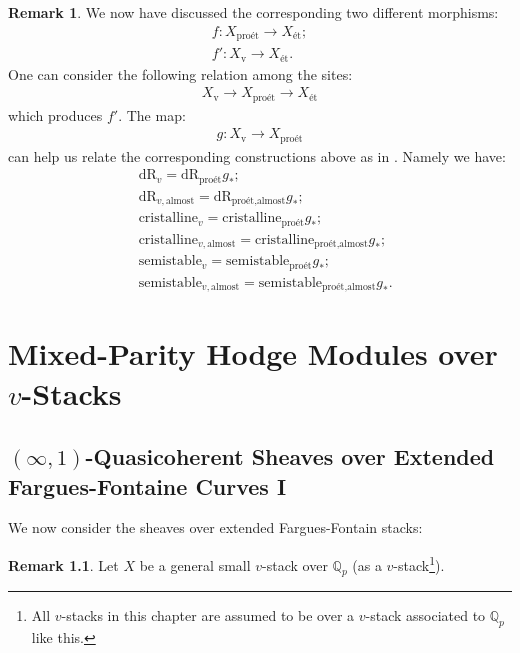 \documentclass[12pt]{book}
\theoremstyle{definition}
\newtheorem{remark}{Remark}
\begin{document}
\begin{remark}
We now have discussed the corresponding two different morphisms:
\begin{align}
f: X_\text{pro\'et}\longrightarrow X_\text{\'et};\\
f': X_\text{v}\longrightarrow X_\text{\'et}.
\end{align}
One can consider the following relation among the sites:
\begin{align}
X_\text{v}\longrightarrow X_\text{pro\'et}\longrightarrow X_\text{\'et}
\end{align}
which produces $f'$. The map:
\begin{align}
g: X_\text{v}\longrightarrow X_\text{pro\'et}
\end{align}
can help us relate the corresponding constructions above as in \cite[Proposition 2.37]{B}. Namely we have:
\begin{align}
&\mathrm{dR}_{v}=\mathrm{dR}_{\text{pro\'et}}g_*;\\
&\mathrm{dR}_{v,\text{almost}}=\mathrm{dR}_{\text{pro\'et},\text{almost}}g_*;\\
&\mathrm{cristalline}_{v}=\mathrm{cristalline}_{\text{pro\'et}}g_*;\\
&\mathrm{cristalline}_{v,\text{almost}}=\mathrm{cristalline}_{\text{pro\'et},\text{almost}}g_*;\\
&\mathrm{semistable}_{v}=\mathrm{semistable}_{\text{pro\'et}}g_*;\\
&\mathrm{semistable}_{v,\text{almost}}=\mathrm{semistable}_{\text{pro\'et},\text{almost}}g_*.
\end{align} 
\end{remark}


\chapter{Mixed-Parity Hodge Modules over $v$-Stacks}



\newpage
\section{$(\infty,1)$-Quasicoherent Sheaves over Extended Fargues-Fontaine Curves I}

\noindent We now consider the sheaves over extended Fargues-Fontain stacks:

\begin{remark}
Let $X$ be a general small $v$-stack over $\mathbb{Q}_p$ (as a $v$-stack\footnote{All $v$-stacks in this chapter are assumed to be over a $v$-stack associated to $\mathbb{Q}_p$ like this.}).  
\end{remark}
\end{document}
